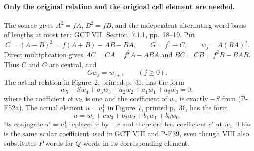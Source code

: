 \paragraph{Only the original relation and the original cell element are needed.}
The source gives $A^2=fA$, $B^2=fB$, and the independent
alternating-word basis of lengths at most ten: GCT VII,
Section~7.1.1, pp.~18--19. Put
\[
       C=(A-B)^2=f(A+B)-AB-BA,
       \qquad G=f^2-C,
       \qquad w_j=A(BA)^j.
                                                               \tag{P-F52b}
\]
Direct multiplication gives
$AC=CA=f^2A-ABA$ and $BC=CB=f^2B-BAB$.
Thus $C$ and $G$ are central, and
\[
                    Gw_j=w_{j+1}\qquad(j\ge0).                 \tag{P-F52c}
\]
The actual relation in Figure~2, printed p.~31, has the form
\[
            w_5-Sw_4+a_3w_3+a_2w_2+a_1w_1+a_0w_0=0,          \tag{P-F52d}
\]
where the coefficient of $w_5$ is one and the coefficient of
$w_4$ is exactly $-S$ from (P-F52a). The actual element $u=u_1^1$ in
Figure~7, printed p.~36, has the form
\[
                  u=w_4+cw_3+b_2w_2+b_1w_1+b_0w_0.            \tag{P-F52e}
\]
Its conjugate $u'=u_2^1$ replaces $x$ by $-x$ and therefore has
coefficient $c'$ at $w_3$. This is the same scalar coefficient
used in GCT VIII and P-F39, even though VIII also substitutes
$P$-words for $Q$-words in its corresponding element.

